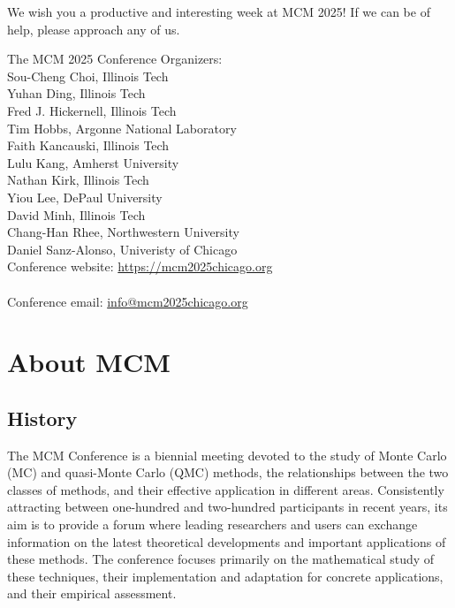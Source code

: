 We wish you a productive and interesting week at MCM 2025! If we can be of help, please approach any of us.



The MCM 2025 Conference Organizers: \\
Sou-Cheng Choi, Illinois Tech \\
Yuhan Ding, Illinois Tech \\
Fred J. Hickernell, Illinois Tech \\
Tim Hobbs, Argonne National Laboratory \\
Faith Kancauski, Illinois Tech \\
Lulu Kang, Amherst University \\
Nathan Kirk, Illinois Tech \\
Yiou Lee, DePaul University \\
David Minh, Illinois Tech \\ 
Chang-Han Rhee, Northwestern University \\
Daniel Sanz-Alonso, Univeristy of Chicago \\

\vspace{1cm}
Conference website: \url{https://mcm2025chicago.org} \\
\\
Conference email: \url{info@mcm2025chicago.org}

\thispagestyle{empty} \tableofcontents

\section{About MCM}

\subsection{History}

The MCM Conference is a biennial meeting devoted to the study of Monte
Carlo (MC) and quasi-Monte Carlo (QMC) methods, the relationships between
the two classes of methods, and their effective application in different
areas. Consistently attracting between one-hundred and two-hundred participants in recent years, its aim
is to provide a forum where leading researchers and users can exchange
information on the latest theoretical developments and important
applications of these methods. The conference focuses primarily
on the mathematical study of these techniques, their implementation and
adaptation for concrete applications, and their empirical assessment.

